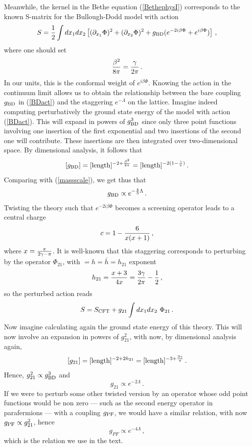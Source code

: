 \documentclass[11pt]{article}
\begin{document}
Meanwhile, the kernel in the Bethe equation (\ref{BethephysI}) corresponds to the 
known S-matrix \cite{Takacs,Birgit1} for the Bullough-Dodd model \cite{BullDodd} with action
%
\begin{equation}
S={1\over 2} \int dx_1dx_2\left[(\partial_{x_1}\Phi)^2+(\partial_{x_2}\Phi)^2+g_{\rm BD}(e^{-2i\beta\Phi}+e^{i\beta\Phi})\right] \,, \label{BDact}
\end{equation}
%
where one should set 
%
\begin{equation}
{\beta^2\over 8\pi}={\gamma\over 2\pi} \,.
\end{equation}
%
In our units, this is the conformal weight of $e^{i\beta\Phi}$. Knowing the  action in the continuum limit allows us  to obtain the relationship between the bare coupling $g_{\rm BD}$ in (\ref{BDact})  and the staggering $e^{-\Lambda}$ on the lattice. Imagine indeed computing perturbatively the ground state energy of the model with action (\ref{BDact}). This will expand in powers of $g_{\rm BD}^3$ since only three point functions involving one insertion of the first exponential and two insertions of the  second one will contribute. These insertions are then integrated over two-dimensional space. By dimensional analysis, it follows that
$$[g_{\rm BD}]=[\hbox{length}]^{-2+{\beta^2\over 2\pi}}=[\hbox{length}]^{-{2(1-{\gamma\over\pi})}} \,.$$
Comparing with (\ref{massscale}), we get thus that
%
\begin{equation}
g_{\rm BD}\propto e^{-{4\over 3}\Lambda} \,. \label{couprel}
\end{equation}
%
Twisting the theory such that $e^{-2i\beta\Phi}$ becomes a screening operator leads to a central charge
%
\begin{equation}
c=1-{6\over x(x+1)} \,,
\end{equation}
%
where $x={\pi\over 2\gamma-\pi}$. It is well-known \cite{Takacs, Efthimiou} that this staggering corresponds to  
perturbing by the operator $\Phi_{21}$, with  $=h=\bar{h}=h_{21}$ exponent 
%
\begin{equation}
h_{21}={x+3\over 4x}={3\gamma\over 2\pi}-{1\over 2} \,,
\end{equation}
%
so the perturbed action reads
%
\begin{equation}
S=S_{\rm CFT}+g_{21}\int dx_1dx_2~ \Phi_{21} \,.
\end{equation}
%
Now imagine calculating again the ground state energy of this theory. This will now involve an expansion in powers of 
$g_{21}^2$, with now, by dimensional analysis again, 
$$[g_{21}]=[\hbox{length}]^{-2+2h_{21}}=[\hbox{length}]^{-3+{3\gamma\over\pi}} \,.$$
Hence, $g_{21}^2\propto g_{\rm BD}^3$ and 
%
\begin{equation}
g_{21}\propto e^{-2\Lambda} \,.
\end{equation}
%
If we were to perturb some other twisted version by an operator whose odd point functions would be non zero --- such as the second energy operator in parafermions ---  with a coupling  $g_{\rm PF}$, we would have a similar relation, with now $g_{\rm PF}\propto g_{21}^2$, hence 
%
\begin{equation}
g_{PF}\propto e^{-4\Lambda} \,,
\end{equation}
%
which is the relation we use in the text. 
 
\end{document}
